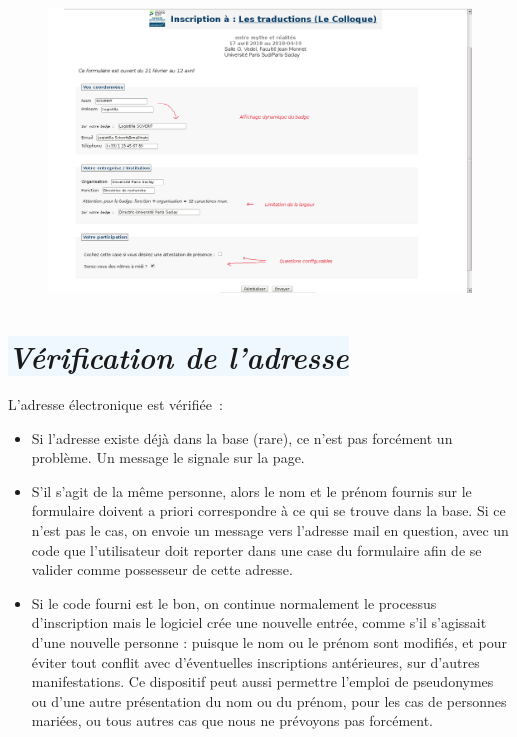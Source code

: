 \documentclass[10pt,a4paper]{article}
\newcommand{\bleupale}[1]{\colorbox{AliceBlue}{#1}}
\begin{document}
\begin{figure}[h]
  \includegraphics[width=500px]{images/formulaire-inscription-2}
\end{figure}

\newpage
\section*{\bleupale{\emph{Vérification de l'adresse}}}

L'adresse électronique est vérifiée :
\begin{itemize}
  \item Si l'adresse existe déjà dans la base (rare), ce n'est pas forcément un problème. Un message le signale sur la page.
  \item S'il s'agit de la même personne, alors le nom et le prénom fournis sur le formulaire doivent a priori correspondre à ce qui se trouve dans la base. Si ce n'est pas le cas, on envoie un message vers l'adresse mail en question, avec un code que l'utilisateur doit reporter dans une case du formulaire afin de se valider comme possesseur de cette adresse.
  \item Si le code fourni est le bon, on continue normalement le processus d'inscription mais le logiciel crée une nouvelle entrée, comme s'il s'agissait d'une nouvelle personne : puisque le nom ou le prénom sont modifiés, et pour éviter tout conflit avec d'éventuelles inscriptions antérieures, sur d'autres manifestations. Ce dispositif peut aussi permettre l'emploi de pseudonymes ou d'une autre présentation du nom ou du prénom, pour les cas de personnes mariées, ou tous autres cas que nous ne prévoyons pas forcément.
  \end{itemize}
\end{document}
